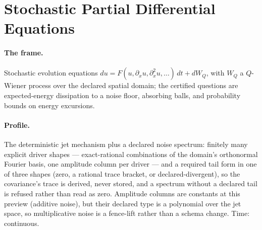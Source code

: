 

\section{Stochastic Partial Differential Equations}
\label{sec:mt-spde}

\paragraph{The frame.} Stochastic evolution equations $du =
F(u, \partial_x u, \partial_x^2 u, \ldots)\,dt + dW_Q$, with $W_Q$ a
$Q$-Wiener process over the declared spatial domain; the certified
questions are expected-energy dissipation to a noise floor, absorbing
balls, and probability bounds on energy excursions.

\paragraph{Profile.} The deterministic jet mechanism plus a declared
noise spectrum: finitely many explicit driver shapes ---
exact-rational combinations of the domain's orthonormal Fourier
basis, one amplitude column per driver --- and a required tail form
in one of three shapes (zero, a rational trace bracket, or
declared-divergent), so the covariance's trace is derived, never
stored, and a spectrum without a declared tail is refused rather than
read as zero. Amplitude columns are constants at this preview
(additive noise), but their declared type is a polynomial over the
jet space, so multiplicative noise is a fence-lift rather than a
schema change. Time: continuous.

